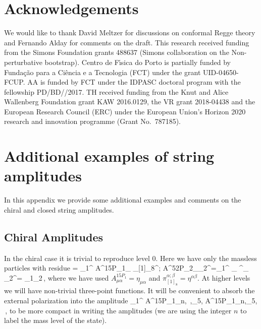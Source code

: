 \section{Acknowledgements}
\label{sec:ack}

We would like to thank David Meltzer for discussions on conformal Regge theory and Fernando Alday for comments on the draft. 
This research received funding from the Simons Foundation grants 488637  (Simons collaboration on the Non-perturbative bootstrap).
Centro de F\'\i sica do Porto is partially funded by Funda\c c\~ao para a Ci\^encia e a Tecnologia (FCT) under the grant
UID-04650-FCUP.
AA is funded by FCT under the IDPASC doctoral program with the fellowship  PD/BD//2017.
TH received funding from the Knut and Alice Wallenberg Foundation grant KAW 2016.0129, the VR grant 2018-04438 and the European Research Council (ERC) under the European Union’s Horizon
2020 research and innovation programme (Grant No.\ 787185).
 
\appendix

\section{Additional examples of string amplitudes}
\label{sec:examples}
In this appendix we provide some additional examples and comments on the chiral and closed string amplitudes.
\subsection{Chiral Amplitudes}

In the chiral case it is trivial to reproduce level 0. Here we have only the massless particles with residue
	\beq
		  = \epsilon_1^{\mu} A^{15P_1}_{\mu \alpha} \pi_{[1]_8}^{\alpha;\beta} A^{52P_2}_{\beta \nu}\epsilon_2^{\nu}=\epsilon_1^{\mu} \eta_{\mu \alpha} \eta^{\alpha \beta}\eta_{\beta \nu} \epsilon_2^\nu= \epsilon_1\cdot \epsilon_2\,,
	\eeq
where we have used $A^{15P_1}_{\mu \alpha}= \eta_{\mu \alpha}$ and $\pi_{[1]_8}^{\alpha;\beta}=\eta^{\alpha \beta}$. At higher levels we will have non-trivial three-point functions. It will be convenient to absorb the external polarization into the amplitude
	\beq
		\epsilon_1^{\mu} A^{15P_1}_{n,\, \mu,\rho_5, \bnu} \equiv A^{15P_1}_{n,\rho_5, \bnu}\,,
	\eeq
to be more compact in writing the amplitudes (we are using the integer $n$ to label the mass level of the state). 

